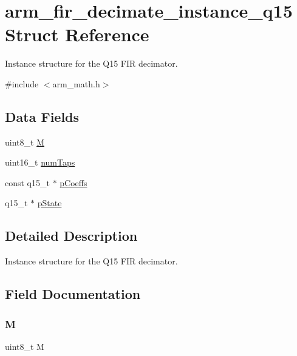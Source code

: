 \hypertarget{structarm__fir__decimate__instance__q15}{}\section{arm\+\_\+fir\+\_\+decimate\+\_\+instance\+\_\+q15 Struct Reference}
\label{structarm__fir__decimate__instance__q15}


Instance structure for the Q15 F\+IR decimator.  




{\ttfamily \#include $<$arm\+\_\+math.\+h$>$}

\subsection*{Data Fields}
\begin{DoxyCompactItemize}
\item 
uint8\+\_\+t \mbox{\hyperlink{structarm__fir__decimate__instance__q15_ae2c8107d00d3c9942e7a20fc598edecf}{M}}
\item 
uint16\+\_\+t \mbox{\hyperlink{structarm__fir__decimate__instance__q15_a751941891e47f522a7f5375fe8990aac}{num\+Taps}}
\item 
const q15\+\_\+t $\ast$ \mbox{\hyperlink{structarm__fir__decimate__instance__q15_ae85d417edcdce57e9a54f8c841580578}{p\+Coeffs}}
\item 
q15\+\_\+t $\ast$ \mbox{\hyperlink{structarm__fir__decimate__instance__q15_ae29dfdb736374fcddaeaec4b7770170c}{p\+State}}
\end{DoxyCompactItemize}


\subsection{Detailed Description}
Instance structure for the Q15 F\+IR decimator. 

\subsection{Field Documentation}
\mbox{\label{structarm__fir__decimate__instance__q15_ae2c8107d00d3c9942e7a20fc598edecf}} 
\subsubsection{\texorpdfstring{M}{M}}
{\footnotesize\ttfamily uint8\+\_\+t M}

